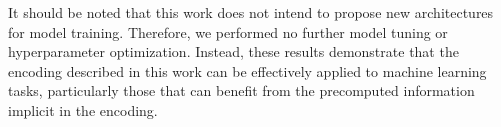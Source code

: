 \documentclass[%
 preprint,
superscriptaddress,
 amsmath,amssymb,
 aip,
 jcp,
]{revtex4-2}
\begin{document}

It should be noted that this work does not intend to propose new architectures for model training.
Therefore, we performed no further model tuning or hyperparameter optimization.
Instead, these results demonstrate that the encoding described in this work can be effectively applied to machine learning tasks, particularly those that can benefit from the precomputed information implicit in the encoding.



\end{document}

